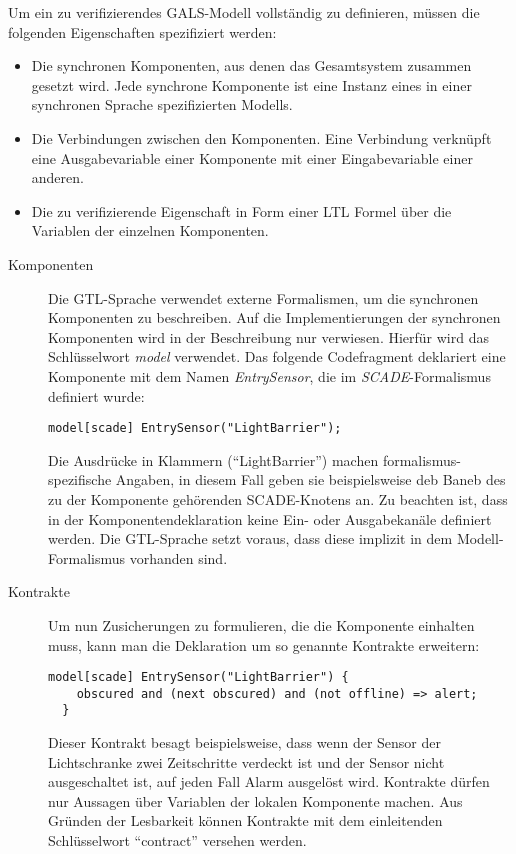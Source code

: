 Um ein zu verifizierendes GALS-Modell vollständig zu definieren, müssen die folgenden Eigenschaften spezifiziert werden:
\begin{itemize}
\item Die synchronen Komponenten, aus denen das Gesamtsystem zusammen gesetzt wird.
  Jede synchrone Komponente ist eine Instanz eines in einer synchronen Sprache spezifizierten Modells.
\item Die Verbindungen zwischen den Komponenten.
  Eine Verbindung verknüpft eine Ausgabevariable einer Komponente mit einer Eingabevariable einer anderen.
\item Die zu verifizierende Eigenschaft in Form einer LTL Formel über die Variablen der einzelnen Komponenten.
\end{itemize}

\begin{description}
\item[Komponenten] Die GTL-Sprache verwendet externe Formalismen, um die synchronen Komponenten zu beschreiben.
Auf die Implementierungen der synchronen Komponenten wird in der Beschreibung nur verwiesen.
Hierfür wird das Schlüsselwort \emph{model} verwendet.
Das folgende Codefragment deklariert eine Komponente mit dem Namen \emph{EntrySensor}, die im \emph{SCADE}-Formalismus definiert wurde:
\begin{lstlisting}[language=gtl]
  model[scade] EntrySensor("LightBarrier");
\end{lstlisting}
Die Ausdrücke in Klammern ("`LightBarrier"') machen formalismus-spezifische Angaben, in diesem Fall geben sie beispielsweise deb Baneb des zu der Komponente gehörenden SCADE-Knotens an.
Zu beachten ist, dass in der Komponentendeklaration keine Ein- oder Ausgabekanäle definiert werden.
Die GTL-Sprache setzt voraus, dass diese implizit in dem Modell-Formalismus vorhanden sind.

\item[Kontrakte] Um nun Zusicherungen zu formulieren, die die Komponente einhalten muss, kann man die Deklaration um so genannte Kontrakte erweitern:
\begin{lstlisting}[language=gtl]
  model[scade] EntrySensor("LightBarrier") {
    obscured and (next obscured) and (not offline) => alert;
  }
\end{lstlisting}
Dieser Kontrakt besagt beispielsweise, dass wenn der Sensor der Lichtschranke zwei Zeitschritte verdeckt ist und der Sensor nicht ausgeschaltet ist, auf jeden Fall Alarm ausgelöst wird.
Kontrakte dürfen nur Aussagen über Variablen der lokalen Komponente machen.
Aus Gründen der Lesbarkeit können Kontrakte mit dem einleitenden Schlüsselwort "`contract"' versehen werden.


\end{description}
